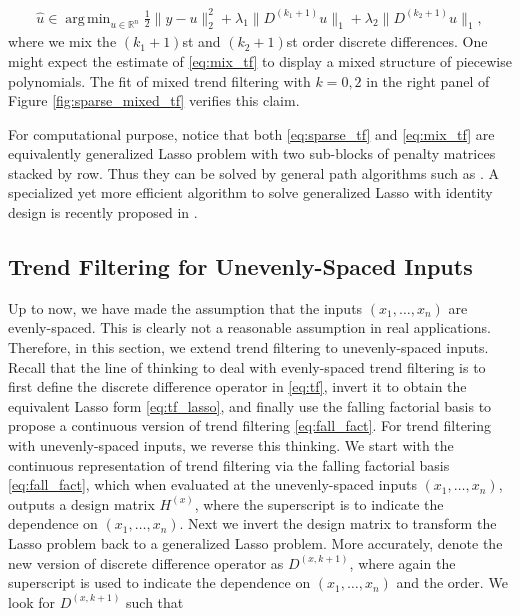 \documentclass[a4paper]{article}
\DeclareMathOperator*{\argmin}{arg\,min}
\newcommand{\RR}{\mathbb{R}}
\begin{document}
\begin{align}
\hat{u} \in \argmin_{u\in\RR^n}\frac{1}{2}\|y-u\|_2^2 + \lambda_1\|D^{(k_1+1)}u\|_1 + \lambda_2\|D^{(k_2+1)}u\|_1,
\label{eq:mix_tf}
\end{align}
where we mix the $(k_1+1)$st and $(k_2+1)$st order discrete differences. One might expect the estimate of \eqref{eq:mix_tf} to display a mixed structure of piecewise polynomials. The fit of mixed trend filtering with $k=0,2$ in the right panel of Figure \ref{fig:sparse_mixed_tf} verifies this claim. 

For computational purpose, notice that both \eqref{eq:sparse_tf} and \eqref{eq:mix_tf} are equivalently generalized Lasso problem with two sub-blocks of penalty matrices stacked by row. Thus they can be solved by general path algorithms such as \cite{tibshirani2011solution,arnold2016efficient}. A specialized yet more efficient algorithm to solve generalized Lasso with identity design is recently proposed in \cite{ramdas2016fast}.

\subsection{Trend Filtering for Unevenly-Spaced Inputs}
\label{subsec:uneven}
Up to now, we have made the assumption that the inputs $(x_1,\ldots, x_n)$ are evenly-spaced. This is clearly not a reasonable assumption in real applications. Therefore, in this section, we extend trend filtering to unevenly-spaced inputs. Recall that the line of thinking to deal with evenly-spaced trend filtering is to first define the discrete difference operator in \eqref{eq:tf}, invert it to obtain the equivalent Lasso form \eqref{eq:tf_lasso}, and finally use the falling factorial basis to propose a continuous version of trend filtering \eqref{eq:fall_fact}. For trend filtering with unevenly-spaced inputs, we reverse this thinking. We start with the continuous representation of trend filtering via the falling factorial basis \eqref{eq:fall_fact}, which when evaluated at the unevenly-spaced inputs $(x_1,\ldots, x_n)$, outputs a design matrix $H^{(x)}$, where the superscript is to indicate the dependence on $(x_1,\ldots, x_n)$. Next we invert the design matrix to transform the Lasso problem back to a generalized Lasso problem. More accurately, denote the new version of discrete difference operator as $D^{(x,k+1)}$, where again the superscript is used to indicate the dependence on $(x_1,\ldots, x_n)$ and the order. We look for $D^{(x,k+1)}$ such that
\end{document}
